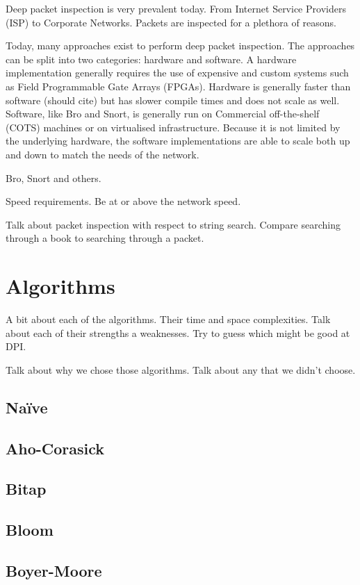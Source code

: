 \documentclass{article}
\begin{document}
Deep packet inspection is very prevalent today. From Internet Service Providers (ISP) to Corporate Networks. Packets are inspected for a plethora of reasons. 

Today, many approaches exist to perform deep packet inspection. The approaches can be split into two categories: hardware and software. A hardware implementation generally requires the use of expensive and custom systems such as Field Programmable Gate Arrays (FPGAs). Hardware is generally faster than software (should cite) but has slower compile times and does not scale as well. Software, like Bro and Snort, is generally run on Commercial off-the-shelf (COTS) machines or on virtualised infrastructure. Because it is not limited by the underlying hardware, the software implementations are able to scale both up and down to match the needs of the network.

Bro, Snort and others.

Speed requirements. Be at or above the network speed.

Talk about packet inspection with respect to string search. Compare searching through a book to searching through a packet.

\section{Algorithms}

A bit about each of the algorithms. Their time and space complexities. Talk about each of their strengths a weaknesses. Try to guess which might be good at DPI.

Talk about why we chose those algorithms. Talk about any that we didn't choose.

\subsection{Na{\"i}ve}
\subsection{Aho-Corasick}
\cite{Aho1975}
\subsection{Bitap}
\cite{Baeza1992}
\subsection{Bloom}
\cite{Bloom1970}
\subsection{Boyer-Moore}
\cite{Boyer1977}
\end{document}

